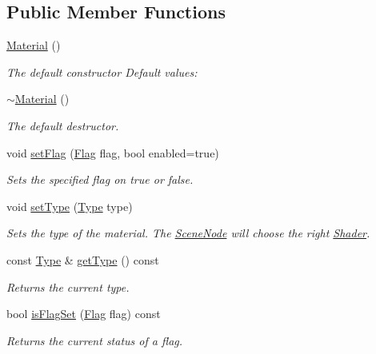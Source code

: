 \subsection*{Public Member Functions}
\begin{DoxyCompactItemize}
\item 
\hyperlink{classburn_1_1_material_a790cff05e96bd7956582777754a56a34}{Material} ()
\begin{DoxyCompactList}\small\item\em The default constructor Default values\-: \end{DoxyCompactList}\item 
\hyperlink{classburn_1_1_material_a449723d0d12182275e5d0d8a6a01f41d}{$\sim$\-Material} ()
\begin{DoxyCompactList}\small\item\em The default destructor. \end{DoxyCompactList}\item 
void \hyperlink{classburn_1_1_material_a833037afe81bc0aa52ceb4581b66087f}{set\-Flag} (\hyperlink{classburn_1_1_material_a704108f8bb133e1911495b84bd0826b8}{Flag} flag, bool enabled=true)
\begin{DoxyCompactList}\small\item\em Sets the specified flag on true or false. \end{DoxyCompactList}\item 
void \hyperlink{classburn_1_1_material_a287ad604c643dc76fc07d27b45ceecd2}{set\-Type} (\hyperlink{classburn_1_1_material_a2d219315cf05e59bbffe8e3831cc6c43}{Type} type)
\begin{DoxyCompactList}\small\item\em Sets the type of the material. The \hyperlink{classburn_1_1_scene_node}{Scene\-Node} will choose the right \hyperlink{classburn_1_1_shader}{Shader}. \end{DoxyCompactList}\item 
const \hyperlink{classburn_1_1_material_a2d219315cf05e59bbffe8e3831cc6c43}{Type} \& \hyperlink{classburn_1_1_material_a46b4ee518276ce465566b0fe8fdc169a}{get\-Type} () const 
\begin{DoxyCompactList}\small\item\em Returns the current type. \end{DoxyCompactList}\item 
bool \hyperlink{classburn_1_1_material_afa32027c9de752c96b74e08b3f1e42af}{is\-Flag\-Set} (\hyperlink{classburn_1_1_material_a704108f8bb133e1911495b84bd0826b8}{Flag} flag) const 
\begin{DoxyCompactList}\small\item\em Returns the current status of a flag. \end{DoxyCompactList}\end{DoxyCompactItemize}


